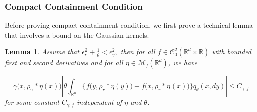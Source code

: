 \documentclass[12pt]{article}
\newtheorem{lemma}[theorem]{Lemma}
\begin{document}
\subsubsection{Compact Containment Condition}
Before proving compact containment condition,
we first prove a technical lemma that involves a bound on the Gaussian kernels.
\begin{lemma}
    \label{lem: gamma - r radius comparison}
    Assume that $\epsilon_{r}^2 + \frac{1}{\theta} < \epsilon_{\gamma}^2,$ then
    for all $f \in \mathcal{C}^{2}_{0}(\mathbb{R}^d \times \mathbb{R})$
    with bounded first and second derivatives
    and for all $\eta \in \mathcal{M}_{f}(\mathbb{R}^d)$, we have 
    
    \begin{equation}\label{eq: gamma - r radius comparison bound}
    \gamma\big(x,\rho_{\gamma}*\eta(x)\big)
    \left| \theta 
        \int_{\mathbb{R}^n} 
            \big\{
                f\big(y,\rho_{r}*\eta(y)\big)-f\big(x,\rho_{r}*\eta(x)\big)
            \big\}
        q_{\theta}(x,dy)
    \right|
    \leq C_{\gamma, f}    
    \end{equation}
    for some constant $C_{\gamma,f}$ independent of $\eta$ and $\theta$. 
\end{lemma}
\end{document}
